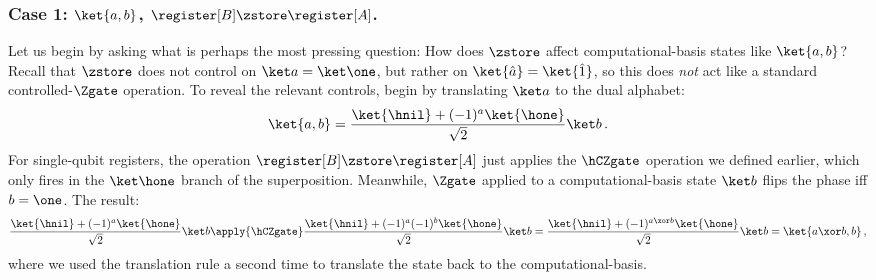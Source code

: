     \subsubsection{Case 1: $\ket{a, b}$, $\register[B] \zstore \register[A]$.}
      Let us begin by asking what is perhaps the most pressing question: How
        does $\zstore$ affect computational-basis 
        states like $\ket{a,b}$? 
        Recall that $\zstore$ does not control on $\ket a = \ket \one$, but
        rather on $\ket{\hat a} = \ket{\hat 1}$, so this does
        \emph{not} act like a standard controlled-$\Zgate$ operation.
        To reveal the relevant controls, begin by 
        translating $\ket a$ to the dual alphabet:
      \[
        \ket{a,b} = \frac{\ket{\hnil} + (-1)^a \ket{\hone}}{\sqrt 2}\ket b\, .
      \]
      For single-qubit registers, the operation $\register[B] \zstore
        \register[A]$ just applies the $\hCZgate$ operation we defined earlier,
        which only fires in the $\ket \hone$ branch of the superposition.
        Meanwhile, $\Zgate$ applied to a computational-basis state $\ket
        b$ flips the phase iff $b = \one$. The result:
      \[
        \frac{\ket{\hnil} + (-1)^a \ket{\hone}}{\sqrt 2}\ket b
          \apply{\hCZgate} 
          \frac{\ket{\hnil} + (-1)^{a} (-1)^{b} \ket{\hone}}{\sqrt 2}\ket b
          = \frac{\ket{\hnil} + (-1)^{a \xor b} \ket{\hone}}{\sqrt 2}\ket b
          = \ket{a \xor b, b}\, ,
      \]
      where we used the translation rule a second time to translate the state back to the
        computational-basis.

